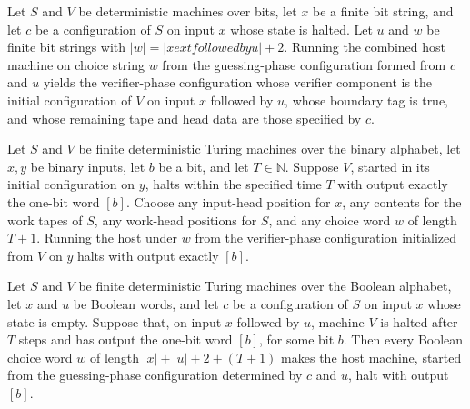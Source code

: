\begin{lemma}
\label{Complexity.b2_assembly}
\leanok
{}
Let $S$ and $V$ be deterministic machines over bits, let $x$ be a finite bit string, and
let $c$ be a configuration of $S$ on input $x$ whose state is halted. Let $u$ and $w$ be
finite bit strings with $|w|=|x	ext{ followed by }u|+2$. Running the combined host
machine on choice string $w$ from the guessing-phase configuration formed from $c$ and
$u$ yields the verifier-phase configuration whose verifier component is the initial
configuration of $V$ on input $x$ followed by $u$, whose boundary tag is true, and whose
remaining tape and head data are those specified by $c$.
\end{lemma}

\begin{lemma}
\label{Complexity.b2_verify_timed}
\leanok
{}
Let $S$ and $V$ be finite deterministic Turing machines over the binary alphabet, let
$x,y$ be binary inputs, let $b$ be a bit, and let $T\in\mathbb{N}$. Suppose $V$, started
in its initial configuration on $y$, halts within the specified time $T$ with output
exactly the one-bit word $[b]$. Choose any input-head position for $x$, any contents for
the work tapes of $S$, any work-head positions for $S$, and any choice word $w$ of
length $T+1$. Running the host under $w$ from the verifier-phase configuration
initialized from $V$ on $y$ halts with output exactly $[b]$.
\end{lemma}

\begin{lemma}
\label{Complexity.b2_finish}
\leanok
{}
Let $S$ and $V$ be finite deterministic Turing machines over the Boolean alphabet, let
$x$ and $u$ be Boolean words, and let $c$ be a configuration of $S$ on input $x$ whose
state is empty. Suppose that, on input $x$ followed by $u$, machine $V$ is halted after
$T$ steps and has output the one-bit word $[b]$, for some bit $b$. Then every Boolean
choice word $w$ of length $|x|+|u|+2+(T+1)$ makes the host machine, started from the
guessing-phase configuration determined by $c$ and $u$, halt with output $[b]$.
\end{lemma}

